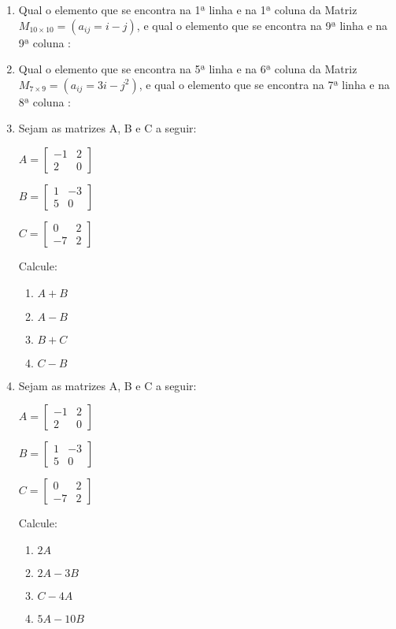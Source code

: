 \documentclass[oneside,a4paper,10pt]{article}
\newcommand{\PC}[1]{\ensuremath{\left(#1\right)}}
\begin{document}
\begin{enumerate}
\item Qual o elemento que se encontra na 1ª linha e na 1ª coluna da Matriz $M_{10 \times 10}=\PC{a_{ij}=i-j}$, e qual o elemento que se encontra na 9ª linha e na 9ª coluna :
	
\item Qual o elemento que se encontra na 5ª linha e na 6ª coluna da Matriz $M_{7 \times 9}=\PC{a_{ij}=3i-j^{2}}$, e qual o elemento que se encontra na 7ª linha e na 8ª coluna :

\item Sejam as matrizes A, B e C a seguir:
\begin{multicols}{3}
$ A = \left[		
\begin{array}{cc}
-1   & 2    \\
2  & 0
\end{array}
\right] $

$ B = \left[		
\begin{array}{cc}
1   & -3    \\
5  & 0
\end{array}
\right] $				

$ C = \left[		
\begin{array}{cc}
0   & 2    \\
-7  & 2
\end{array}
\right] $
\end{multicols}
Calcule:
\begin{multicols}{4}
\begin{enumerate}
\item $A+B$
\item $A-B$
\item $B+C$
\item $C-B$
\end{enumerate}
\end{multicols}

\item Sejam as matrizes A, B e C a seguir:
\begin{multicols}{3}
$ A = \left[		
\begin{array}{cc}
-1   & 2    \\
2  & 0
\end{array}
\right] $

$ B = \left[		
\begin{array}{cc}
1   & -3    \\
5  & 0
\end{array}
\right] $				

$ C = \left[		
\begin{array}{cc}
0   & 2    \\
-7  & 2
\end{array}
\right] $
\end{multicols}
Calcule:
\begin{multicols}{4}
\begin{enumerate}
\item $2A$
\item $2A-3B$
\item $C-4A$
\item $5A-10B$
\end{enumerate}
\end{multicols}
		

\end{enumerate}
\end{document}
